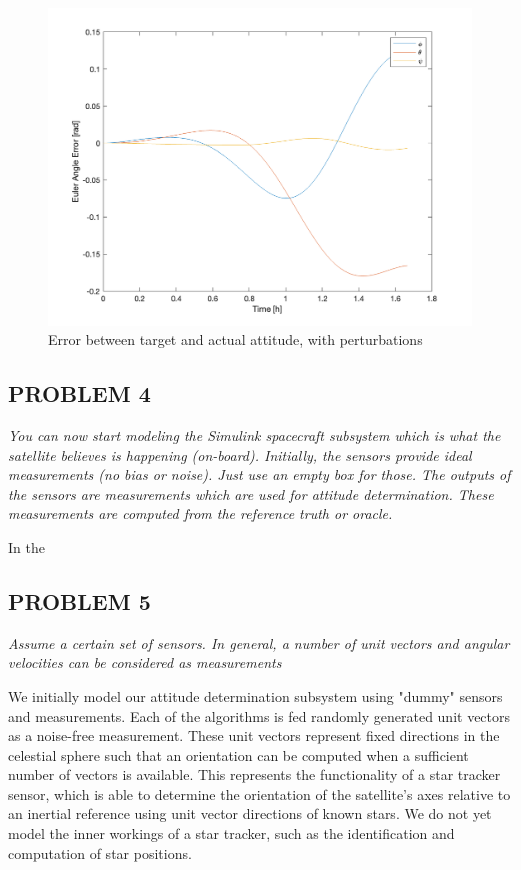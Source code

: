 \begin{figure}[H]
\centering
\includegraphics[scale=0.6]{Images/ps6_problem3_error.png}
\caption{Error between target and actual attitude, with perturbations}
\label{fig:Images/ps6_problem3_error}
\end{figure}

\subsection{PROBLEM 4}
\textit{You can now start modeling the Simulink spacecraft subsystem which is what the satellite believes is happening (on-board). Initially, the sensors provide ideal measurements (no bias or noise). Just use an empty box for those. The outputs of the sensors are measurements which are used for attitude determination. These measurements are computed from the reference truth or oracle.}

In the 

\subsection{PROBLEM 5}
\textit{Assume a certain set of sensors. In general, a number of unit vectors and angular velocities can be considered as measurements}

We initially model our attitude determination subsystem using "dummy" sensors and measurements. Each of the algorithms is fed randomly generated unit vectors as a noise-free measurement. These unit vectors represent fixed directions in the celestial sphere such that an orientation can be computed when a sufficient number of vectors is available. This represents the functionality of a star tracker sensor, which is able to determine the orientation of the satellite's axes relative to an inertial reference using unit vector directions of known stars. We do not yet model the inner workings of a star tracker, such as the identification and computation of star positions.

